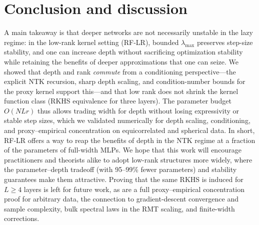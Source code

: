 \section{Conclusion and discussion}

A main takeaway is that deeper networks are not necessarily unstable in the lazy regime: in the low-rank kernel setting (RF-LR), bounded \(\lambda_{\max}\) preserves step-size stability, and one can increase depth without sacrificing optimization stability while retaining the benefits of deeper approximations that one can seize. We showed that depth and rank \emph{commute} from a conditioning perspective---the explicit NTK recursion, sharp depth scaling, and condition-number bounds for the proxy kernel support this---and that low rank does not shrink the kernel function class (RKHS equivalence for three layers). The parameter budget \(O(NLr)\) thus allows trading width for depth without losing expressivity or stable step sizes, which we validated numerically for depth scaling, conditioning, and proxy--empirical concentration on equicorrelated and spherical data. In short, RF-LR offers a way to reap the benefits of depth in the NTK regime at a fraction of the parameters of full-width MLPs. We hope that this work will encourage practitioners and theorists alike to adopt low-rank structures more widely, where the parameter--depth tradeoff (with 95--99\% fewer parameters) and stability guarantees make them attractive. Proving that the same RKHS is induced for \(L\ge 4\) layers is left for future work, as are a full proxy--empirical concentration proof for arbitrary data, the connection to gradient-descent convergence and sample complexity, bulk spectral laws in the RMT scaling, and finite-width corrections.
